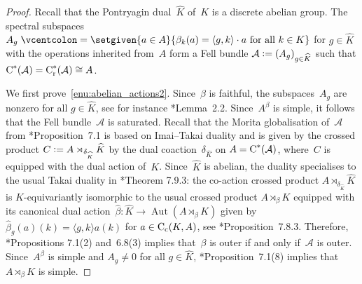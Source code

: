 \documentclass[a4paper]{amsart}
\theoremstyle{plain}
\theoremstyle{definition}
\theoremstyle{remark}
\numberwithin{theorem}{section}
\numberwithin{equation}{section}
\DeclareMathOperator{\Aut}{Aut}%
\newcommand*{\nb}{\nobreakdash}
\newcommand*{\red}{\mathrm{r}}%
\newcommand*{\Cst}{\textup C^*}%
\newcommand*{\Cont}{\textup C}%
\newcommand*{\Contc}{\Cont_\textup c} %
\newcommand*{\A}{\mathcal A}%
\newcommand*{\defeq}{\mathrel{\vcentcolon=}}%
\begin{document}
\begin{proof}
  Recall that the Pontryagin dual~\(\widehat{K}\) of~\(K\) is a discrete
  abelian group.
  The spectral subspaces \(A_g\defeq \setgiven{a\in A}{\beta_k(a)=
    \langle g, k\rangle\cdot  a \text{ for all }k\in K}\) for \(g\in
  \widehat{K}\) with the operations inherited from~\(A\) form a Fell
  bundle \(\A\defeq (A_g)_{g\in \widehat{K}}\) such that
  \(\Cst(\A)=\Cst_\red(\A)\cong A\).

  We first prove~\ref{enu:abelian_actions2}.
  Since~\(\beta\) is faithful, the subspaces~\(A_g\) are nonzero for
  all \(g\in \widehat{K}\), see for instance
  \cite{Bratteli-Elliott-Evans-Kishimoto:Quasi-product}*{Lemma~2.2}.
  Since~\(A^\beta\) is simple, it follows that the Fell bundle~\(\A\)
  is saturated.
  Recall that the Morita globalisation of~\(\A\) from
  \cite{Kwasniewski-Meyer:Aperiodicity}*{Proposition~7.1} is based on
  Imai--Takai duality and is given by the crossed product \(C\defeq
  A\rtimes_{\delta_{\widehat{K}}} \widehat{K}\) by the dual
  coaction~\(\delta_{\widehat{K}}\) on   \(A=\Cst(\A)\),
  where~\(C\) is equipped with the dual action
  of~\(K\).
  Since~\(\widehat{K}\) is abelian, the duality specialises to the
  usual Takai duality in
  \cite{Pedersen:Cstar_automorphisms_vol2}*{Theorem 7.9.3}: the
  co-action crossed product \(A\rtimes_{\delta_{\widehat{K}}}
  \widehat{K}\) is \(K\)\nb-equivariantly isomorphic to the usual
  crossed product \(A\rtimes_\beta K\)  equipped with its canonical
  dual action~\(\widehat{\beta}\colon \widehat{K}\to
  \Aut(A\rtimes_\beta K)\) given by \(\widehat{\beta}_g(a)(k) =
  \langle g, k\rangle a(k)\) for \(a\in \Contc(K,A)\), see
  \cite{Pedersen:Cstar_automorphisms_vol2}*{Proposition~7.8.3}.
  Therefore, \cite{Kwasniewski-Meyer:Aperiodicity}*{Propositions
    7.1(2) and~6.8(3)} implies that~\(\beta\) is outer if and only
  if~\(\A\) is outer.
  Since~\(A^\beta\) is simple and \(A_g\neq0\) for all
  \(g\in\widehat{K}\),
  \cite{Kwasniewski-Meyer:Aperiodicity}*{Proposition~7.1(8)} implies
  that \(A\rtimes_\beta K\) is simple.


\end{proof}
\end{document}
